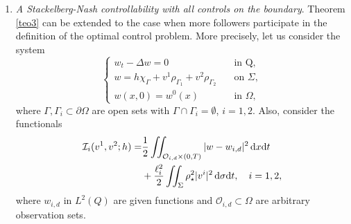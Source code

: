 \documentclass{aims}
\theoremstyle{definition}
\def\cbd{\Gamma}
\def\dx{\,\textnormal{d}x}
\def\dt{\textnormal{d}t}
\def\d{\,\textnormal{d}}
\begin{document}
\begin{enumerate}
\item \textit{A Stackelberg-Nash controllability with all controls on the boundary}. Theorem \ref{teo3} can be extended to the case when more followers participate in the definition of the optimal control problem. More precisely, let us consider the system
%
\begin{equation}\label{sys_sec3}
\begin{cases}
w_t-\Delta w=0 & \quad \text{in Q}, \\
w=h\chi_{\cbd}+ v^1\rho_{\Gamma_1}+v^2\rho_{\Gamma_2}&\quad \text{on } \Sigma, \\
w(x,0)=w^0(x) &\quad \text{in } \Omega,
\end{cases}
\end{equation}
% 
where $\Gamma,\Gamma_i\subset \partial \Omega$ are open sets with $\Gamma\cap\Gamma_i=\emptyset$, $i=1,2$. Also, consider the functionals
%
\begin{equation}\label{func_nash}
\begin{split}
\mathcal I_i(v^1,v^2;h)=&\frac{1}{2}\iint_{\mathcal O_{i,d}\times(0,T)}|w-w_{i,d}|^2\dx\dt\\
&+\frac{\ell_i^2}{2}\iint_{\Sigma}\rho_\star^2|v^{i}|^2\d\sigma\dt, \quad i=1,2,
\end{split}
\end{equation}
%
where $w_{i,d}$ in $L^2(Q)$ are given functions and $\mathcal{O}_{i,d}\subset \Omega$ are arbitrary observation sets.


\end{enumerate}
\end{document}
